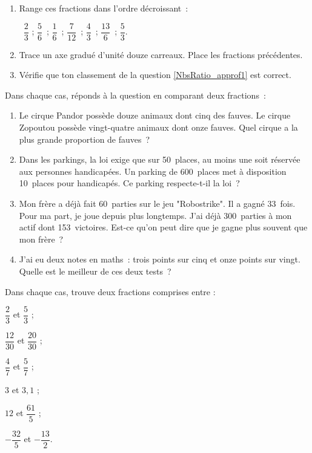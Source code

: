 \begin{exercice}
\begin{enumerate}
 \item Range ces fractions dans l'ordre décroissant : \\[0.1em] \label{NbsRatio_approf1}
\begin{center} $\dfrac{2}{3}$ ; $\dfrac{5}{6}$ ; $\dfrac{1}{6}$ ; $\dfrac{7}{12}$ ; $\dfrac{4}{3}$ ; $\dfrac{13}{6}$ ; $\dfrac{5}{3}$. \end{center}
 \vspace{0.2cm}
 \item Trace un axe gradué d'unité douze carreaux. Place les fractions précédentes.
 \item Vérifie que ton classement de la question \ref{NbsRatio_approf1} est correct.
 \end{enumerate}
\end{exercice}

\newpage


\begin{exercice}
Dans chaque cas, réponds à la question en comparant deux fractions :
\begin{enumerate}
 \item Le cirque Pandor possède douze animaux dont cinq des fauves. Le cirque Zopoutou possède vingt-quatre animaux dont onze fauves. Quel cirque a la plus grande proportion de fauves ?
 \item Dans les parkings, la loi exige que sur 50 places, au moins une soit réservée aux personnes handicapées. Un parking de 600 places met à disposition 10 places pour handicapés. Ce parking respecte-t-il la loi ?
 \item Mon frère a déjà fait 60 parties sur le jeu "Robostrike". Il a gagné 33 fois. Pour ma part, je joue depuis plus longtemps. J'ai déjà 300 parties à mon actif dont 153 victoires. Est-ce qu'on peut dire que je gagne plus souvent que mon frère ?
 \item J'ai eu deux notes en maths : trois points sur cinq et onze points sur vingt. Quelle est le meilleur de ces deux tests ? 
 \end{enumerate}
\end{exercice}


\begin{exercice}[Intercaler]
Dans chaque cas, trouve deux fractions comprises entre :
\begin{colenumerate}{3}
 \item $\dfrac{2}{3}$ et $\dfrac{5}{3}$ ; 
 \vspace{0.2cm}
 \item $\dfrac{12}{30}$ et $\dfrac{20}{30}$ ; 
 \item $\dfrac{4}{7}$ et $\dfrac{5}{7}$ ; 
 \item $3$ et $3,1$ ; 
 \item $12$ et $\dfrac{61}{5}$ ; 
 \item $- \dfrac{32}{5}$ et $- \dfrac{13}{2}$.
 \end{colenumerate}
\end{exercice}

